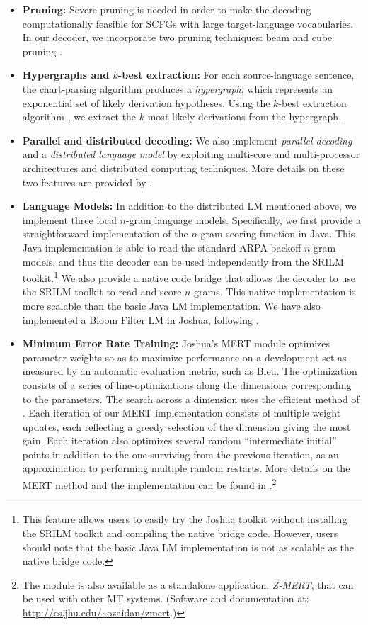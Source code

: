 \documentclass[11pt]{article}
\begin{document}
\begin{itemize}
\item \textbf{Pruning:} Severe pruning is needed in order to make the decoding computationally feasible for SCFGs with large target-language vocabularies. In our decoder, we incorporate two pruning techniques: beam and cube pruning \cite{Chiang2007}.

\item \textbf{Hypergraphs and $k$-best extraction:}
For each source-language sentence, the chart-parsing algorithm produces a \emph{hypergraph}, which represents an exponential set of likely derivation hypotheses. Using the $k$-best extraction algorithm \cite{Huang2005}, we extract the $k$ most likely derivations from the hypergraph.

\item \textbf{Parallel and distributed decoding:}
We also implement \emph{parallel decoding} and a \emph{distributed language model} by exploiting multi-core and multi-processor architectures and distributed computing techniques. More details on these two features are provided by .

\item \textbf{Language Models:} In addition to the distributed LM mentioned above, we implement three local $n$-gram language models. Specifically, we first provide a straightforward implementation of the $n$-gram scoring function in Java. This Java implementation is able to read the standard ARPA backoff $n$-gram models, and thus the decoder can be used independently from the SRILM toolkit.\footnote{This feature allows users to easily try the Joshua toolkit without installing the SRILM toolkit and compiling the native bridge code. However, users should note that the basic Java LM implementation is not as scalable as the native bridge code.} We also provide a native code bridge that allows the decoder to use the SRILM toolkit to read and score $n$-grams. This native implementation is more scalable than the basic Java LM implementation. We have also implemented a Bloom Filter LM in Joshua, following .

\item \textbf{Minimum Error Rate Training:} Joshua's MERT module optimizes parameter weights so as to maximize performance on a development set as measured by an automatic evaluation metric, such as Bleu. The optimization consists of a series of line-optimizations along the dimensions corresponding to the parameters. The search across a dimension uses the efficient method of . Each iteration of our MERT implementation consists of multiple weight updates, each reflecting a greedy selection of the dimension giving the most gain. Each iteration also optimizes several random ``intermediate initial'' points in addition to the one surviving from the previous iteration, as an approximation to performing multiple random restarts. More details on the MERT method and the implementation can be found in .\footnote{The module is also available as a standalone application, {\em Z-MERT}, that can be used with other MT systems. (Software and documentation at: \url{http://cs.jhu.edu/~ozaidan/zmert}.)}




\end{itemize}
\end{document}
